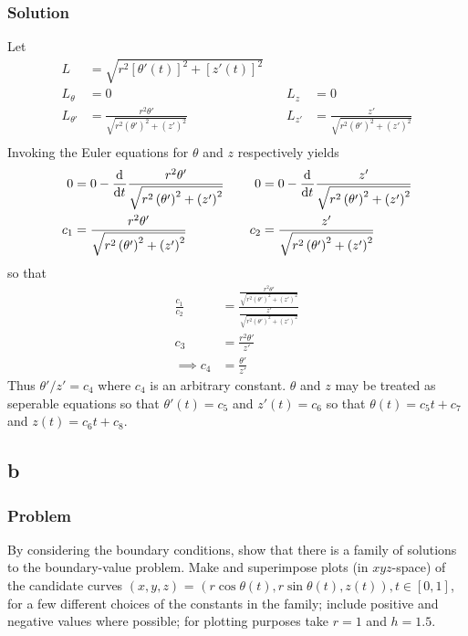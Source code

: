 \documentclass[12pt,twoside]{article}
\begin{document}
\subsubsection*{Solution}
Let
\begin{align*}
  L &= \sqrt{r^2{[\theta'(t)]}^2 + {[z'(t)]}^2} \\
  L_{\theta} &= 0 &\quad L_{z} &= 0 \\
  L_{\theta'} &= \frac{r^2 \theta '}{\sqrt{r^2 \left(\theta '\right)^2+\left(z'\right)^2}}
             &\quad L_{z'} &= \frac{z'}{\sqrt{r^2 \left(\theta '\right)^2+\left(z'\right)^2}} \\
\end{align*}
Invoking the Euler equations for $\theta$ and $z$ respectively yields
\begin{align*}
  0 &= 0 - \frac{\mathrm{d}^{} {}}{\mathrm{d}{t}^{}}\frac{r^2 \theta '}{\sqrt{r^2 \left(\theta '\right)^2+\left(z'\right)^2}} &\quad 0 &= 0 - \frac{\mathrm{d}^{} {}}{\mathrm{d}{t}^{}}\frac{z'}{\sqrt{r^2 \left(\theta '\right)^2+\left(z'\right)^2}} \\
  c_1 &= \frac{r^2 \theta '}{\sqrt{r^2 \left(\theta '\right)^2+\left(z'\right)^2}} &\quad c_2 &= \frac{z'}{\sqrt{r^2 \left(\theta '\right)^2+\left(z'\right)^2}} \\
\end{align*}
so that
\begin{align*}
  \frac{c_1}{c_2} &= \frac{\frac{r^2 \theta '}{\sqrt{r^2 \left(\theta '\right)^2+\left(z'\right)^2}}}{\frac{z'}{\sqrt{r^2 \left(\theta '\right)^2+\left(z'\right)^2}}} \\
  c_3 &= \frac{r^2\theta'}{z'} \\
  \implies c_4 &= \frac{\theta'}{z'}
\end{align*}
Thus $\theta'/z'=c_4$ where $c_4$ is an arbitrary constant. $\theta$ and $z$ may
be treated as seperable equations so that $\theta'(t)=c_5$ and $z'(t)=c_6$ so
that $\theta(t)=c_5t+c_7$ and $z(t)=c_6t + c_8$.
\subsection{b}
\subsubsection*{Problem}
By considering the boundary conditions, show that there is a family of solutions
to the boundary-value problem. Make and superimpose plots (in $xyz$-space) of
the candidate curves $(x,y,z)$ = $(r\cos\theta(t),r\sin\theta(t),z(t)), t\in[0,1]$,
for a few different choices of the constants in the family; include positive and
negative values where possible; for plotting purposes take $r = 1$ and $h =
1.5$.
\end{document}
